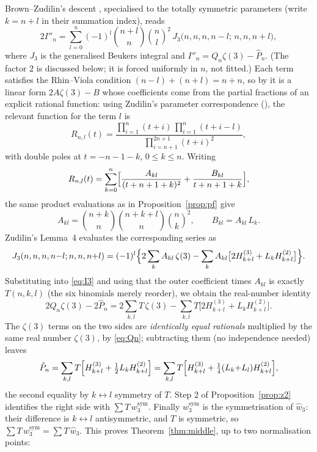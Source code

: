 \documentclass[11pt]{article}
\theoremstyle{remark}
\newcommand{\Hh}[2]{H_{#1}^{(#2)}}
\begin{document}
Brown--Zudilin's descent \cite[eq.~(I3)]{BZ}, specialised to the totally
symmetric parameters (write $k=n+l$ in their summation index), reads
\begin{equation}\label{eq:I3}
 2I''_n=\sum_{l=0}^{n}(-1)^l\binom{n+l}{n}\binom nl^2
 \,J_3\bigl(n,n,n,n{-}l;\,n,n,n{+}l\bigr),
\end{equation}
where $J_3$ is the generalised Beukers integral and
$I''_n=Q_n\zeta(3)-\hat P_n$.  (The factor $2$ is discussed below; it is
forced uniformly in $n$, not fitted.)  Each term satisfies the Rhin--Viola
condition $(n-l)+(n+l)=n+n$, so by \cite[Sec.~3]{Zu02} it is a linear form
$2A\zeta(3)-B$ whose coefficients come from the partial fractions of an
explicit rational function: using Zudilin's parameter correspondence
(\cite[eqs.~(3.8),(3.10)]{Zu02}), the relevant function for the term $l$ is
\[
 R_{n,l}(t)=
 \frac{\prod_{i=1}^n(t+i)\,\prod_{i=1}^n(t+i-l)}
      {\prod_{i=n+1}^{2n+1}(t+i)^2},
\]
with double poles at $t=-n-1-k$, $0\le k\le n$.  Writing
\[
 R_{n,l}(t)=\sum_{k=0}^n\Bigl[\frac{A_{kl}}{(t+n+1+k)^2}
 +\frac{B_{kl}}{t+n+1+k}\Bigr],
\]
the same product evaluations as in Proposition~\ref{prop:pf} give
\begin{equation}\label{eq:AB}
 A_{kl}=\binom{n+k}{n}\binom{n+k+l}{n}\binom nk^2,
 \qquad
 B_{kl}=A_{kl}\,L_k .
\end{equation}
Zudilin's Lemma~4 \cite[eq.~(2.13) and its proof]{Zu02} evaluates the
corresponding series as
\[
 J_3(n,n,n,n{-}l;n,n,n{+}l)
 =(-1)^l\Bigl\{2\sum_kA_{kl}\,\zeta(3)
 -\sum_kA_{kl}\bigl[2\Hh{k+l}3+L_k\Hh{k+l}2\bigr]\Bigr\}.
\]
Substituting into \eqref{eq:I3} and using that the outer coefficient times
$A_{kl}$ is exactly $T(n,k,l)$ (the six binomials merely reorder), we obtain
the real-number identity
\begin{equation}\label{eq:middlereal}
 2Q_n\zeta(3)-2\hat P_n
 =2\sum_{k,l}T\,\zeta(3)
 -\sum_{k,l}T\bigl[2\Hh{k+l}3+L_k\Hh{k+l}2\bigr].
\end{equation}
The $\zeta(3)$ terms on the two sides are \emph{identically equal
rationals} multiplied by the same real number $\zeta(3)$, by \eqref{eq:Qn};
subtracting them (no independence needed) leaves
\begin{equation}\label{eq:M}
 \hat P_n=\sum_{k,l}T\Bigl[\Hh{k+l}3+\tfrac12L_k\Hh{k+l}2\Bigr]
 =\sum_{k,l}T\Bigl[\Hh{k+l}3+\tfrac14(L_k{+}L_l)\Hh{k+l}2\Bigr],
\end{equation}
the second equality by $k\leftrightarrow l$ symmetry of $T$.  Step 2 of
Proposition~\ref{prop:z2} identifies the right side with
$\sum T\,w_3^{\mathrm{sym}}$.  Finally $w_3^{\mathrm{sym}}$ is the
symmetrisation of $\hat w_3$: their difference is $k\leftrightarrow l$
antisymmetric, and $T$ is symmetric, so
$\sum T\,w_3^{\mathrm{sym}}=\sum T\,\hat w_3$.  This proves
Theorem~\ref{thm:middle}, up to two normalisation points:
\end{document}
